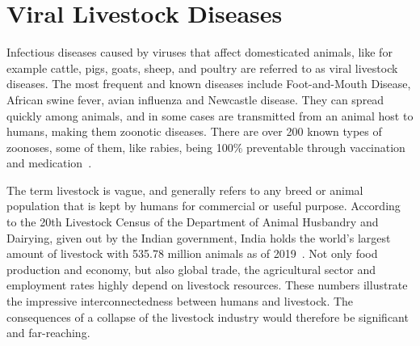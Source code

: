 \section{Viral Livestock Diseases}\label{sec:viral} 
Infectious diseases caused by viruses that affect domesticated animals, like for example cattle, pigs, goats, sheep, and poultry are referred to as viral livestock diseases. The most frequent and known diseases include Foot-and-Mouth Disease, African swine fever, avian influenza and Newcastle disease. They can spread quickly among animals, and in some cases are transmitted from an animal host to humans, making them zoonotic diseases. There are over 200 known types of zoonoses, some of them, like rabies, being 100\% preventable through vaccination and medication~\cite{who2020zoon}. %

The term livestock is vague, and generally refers to any breed or animal population that is kept by humans for commercial or useful purpose. According to the 20th Livestock Census of the Department of Animal Husbandry and Dairying, given out by the Indian government, India holds the world's largest amount of livestock with 535.78 million animals as of 2019~\cite{livestock2019}. %
Not only food production and economy, but also global trade, the agricultural sector and employment rates highly depend on livestock resources. These numbers illustrate the impressive interconnectedness between humans and livestock. The consequences of a collapse of the livestock industry would therefore be significant and far-reaching. %

